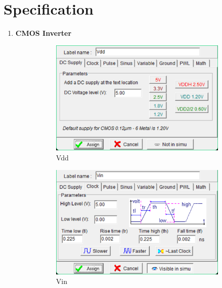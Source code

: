 \documentclass[a4paper,12pt]{article}
\begin{document}
\newpage
\section{Specification}
\begin{enumerate}
\item \textbf{CMOS Inverter}
\begin{figure}[H]
	\centering
	\begin{subfigure}[t]{0.32\textwidth}
		\centering
		\includegraphics[width=1\linewidth]{images/c/vdd1}
		\caption{Vdd}
	\end{subfigure}
	\hfill
	\begin{subfigure}[t]{0.32\textwidth}
		\centering
		\includegraphics[width=1\linewidth]{images/c/vin}
		\caption{Vin}
	\end{subfigure}
	\hfill
	\begin{subfigure}[t]{0.32\textwidth}
		\centering

\end{subfigure}
\end{figure}
\end{enumerate}
\end{document}
